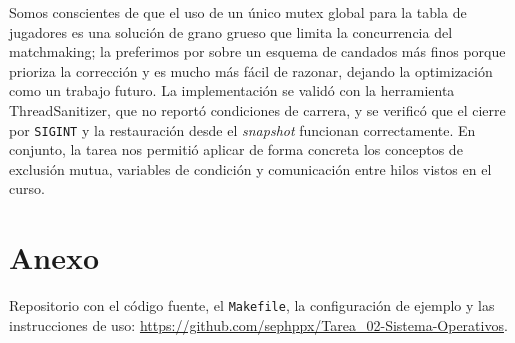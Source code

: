 \documentclass[11pt]{article}
\begin{document}
Somos conscientes de que el uso de un único mutex global para la tabla de
jugadores es una solución de grano grueso que limita la concurrencia del
matchmaking; la preferimos por sobre un esquema de candados más finos porque
prioriza la corrección y es mucho más fácil de razonar, dejando la optimización
como un trabajo futuro. La implementación se validó con la herramienta
ThreadSanitizer, que no reportó condiciones de carrera, y se verificó que el
cierre por \texttt{SIGINT} y la restauración desde el \emph{snapshot} funcionan
correctamente. En conjunto, la tarea nos permitió aplicar de forma concreta los
conceptos de exclusión mutua, variables de condición y comunicación entre hilos
vistos en el curso.

\section*{Anexo}
Repositorio con el código fuente, el \texttt{Makefile}, la configuración de
ejemplo y las instrucciones de uso:
\url{https://github.com/sephppx/Tarea_02-Sistema-Operativos}.
\end{document}
